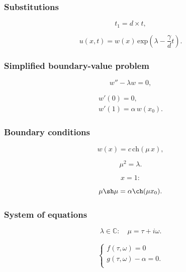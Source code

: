 \documentclass[fullscreen=true, unicode, bookmarks=false]{beamer}
\begin{document}
\begin{frame}
\frametitle{ Substitutions }
	
$$ t_1 = d \times t, $$

\bigskip

$$ u(x, t) = w(x)\,\mbox{exp}\left( \lambda - \frac{\gamma}{d}t \right). $$

\end{frame}


\begin{frame}
\frametitle{ Simplified boundary-value problem }
	
\begin{equation}\label{ivanovsky-eq5}
	w'' - \lambda w = 0,
\end{equation}

\begin{gather}\label{ivanovsky-eq6}	
	w'(0) = 0, \\
	w'(1) = \alpha\,w(x_0). \nonumber
\end{gather}

\end{frame}

\begin{frame}
\frametitle{ Boundary conditions }

$$ w(x) = c \, \mbox{ch} (\mu\,x), $$

$$ \mu^2 = \lambda. $$

\vspace{1.1cm}
\pause
	
$$ x = 1: $$

$$ \mu \sh \mu = \alpha \ch(\mu x_0). $$

\end{frame}

\begin{frame}
\frametitle{ System of equations }
	
$$ \lambda \in \mathbb{C}: \quad \mu = \tau + i \omega. $$

\bigskip

\begin{equation}\label{ivanovsky-eq7}
\begin{array}{l}
\begin{cases}
f(\tau, \omega) = 0 \\
g(\tau, \omega) - \alpha = 0. \\
\end{cases}
\end{array}
\end{equation}

\end{frame}
\end{document}
